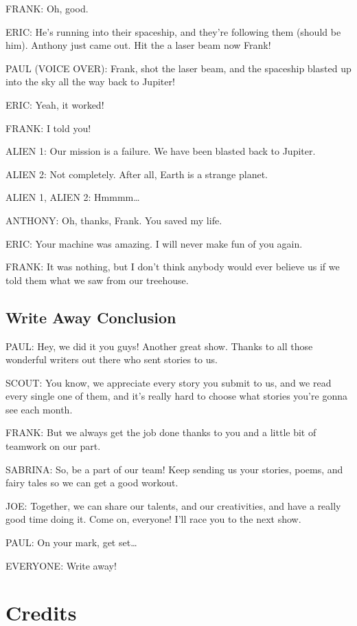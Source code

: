 FRANK:
Oh, good.

ERIC:
He's running into their spaceship, and they're following them (should be him).
Anthony just came out.
Hit the a laser beam now Frank!

PAUL (VOICE OVER):
Frank, shot the laser beam, and the spaceship blasted up into the sky all the way back to Jupiter!

ERIC:
Yeah, it worked!

FRANK:
I told you!

ALIEN 1:
Our mission is a failure.
We have been blasted back to Jupiter.

ALIEN 2:
Not completely.
After all, Earth is a strange planet.

ALIEN 1, ALIEN 2:
Hmmmm\dots

ANTHONY:
Oh, thanks, Frank.
You saved my life.

ERIC:
Your machine was amazing.
I will never make fun of you again.

FRANK:
It was nothing, but I don't think anybody would ever believe us if we told them what we saw from our treehouse.

\subsection{Write Away Conclusion}

PAUL:
Hey, we did it you guys!
Another great show.
Thanks to all those wonderful writers out there who sent stories to us.

SCOUT:
You know, we appreciate every story you submit to us, and we read every single one of them, and it's really hard to choose what stories you're gonna see each month.

FRANK:
But we always get the job done thanks to you and a little bit of teamwork on our part.

SABRINA:
So, be a part of our team!
Keep sending us your stories, poems, and fairy tales so we can get a good workout.

JOE:
Together, we can share our talents, and our creativities, and have a really good time doing it.
Come on, everyone!
I'll race you to the next show.

PAUL:
On your mark, get set\dots

EVERYONE:
Write away!

\section{Credits}


